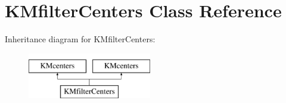 \hypertarget{class_k_mfilter_centers}{
\section{KMfilterCenters Class Reference}
\label{class_k_mfilter_centers}
}
Inheritance diagram for KMfilterCenters:\begin{figure}[H]
\begin{center}
\leavevmode
\includegraphics[height=2cm]{class_k_mfilter_centers}
\end{center}
\end{figure}
